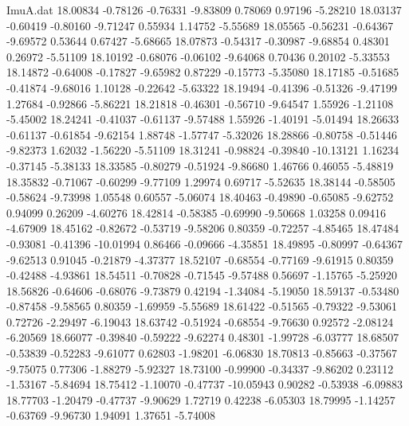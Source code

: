 \begin{filecontents}{ImuA.dat}
  18.00834   -0.78126   -0.76331   -9.83809    0.78069    0.97196   -5.28210
  18.03137   -0.60419   -0.80160   -9.71247    0.55934    1.14752   -5.55689
  18.05565   -0.56231   -0.64367   -9.69572    0.53644    0.67427   -5.68665
  18.07873   -0.54317   -0.30987   -9.68854    0.48301    0.26972   -5.51109
  18.10192   -0.68076   -0.06102   -9.64068    0.70436    0.20102   -5.33553
  18.14872   -0.64008   -0.17827   -9.65982    0.87229   -0.15773   -5.35080
  18.17185   -0.51685   -0.41874   -9.68016    1.10128   -0.22642   -5.63322
  18.19494   -0.41396   -0.51326   -9.47199    1.27684   -0.92866   -5.86221
  18.21818   -0.46301   -0.56710   -9.64547    1.55926   -1.21108   -5.45002
  18.24241   -0.41037   -0.61137   -9.57488    1.55926   -1.40191   -5.01494
  18.26633   -0.61137   -0.61854   -9.62154    1.88748   -1.57747   -5.32026
  18.28866   -0.80758   -0.51446   -9.82373    1.62032   -1.56220   -5.51109
  18.31241   -0.98824   -0.39840  -10.13121    1.16234   -0.37145   -5.38133
  18.33585   -0.80279   -0.51924   -9.86680    1.46766    0.46055   -5.48819
  18.35832   -0.71067   -0.60299   -9.77109    1.29974    0.69717   -5.52635
  18.38144   -0.58505   -0.58624   -9.73998    1.05548    0.60557   -5.06074
  18.40463   -0.49890   -0.65085   -9.62752    0.94099    0.26209   -4.60276
  18.42814   -0.58385   -0.69990   -9.50668    1.03258    0.09416   -4.67909
  18.45162   -0.82672   -0.53719   -9.58206    0.80359   -0.72257   -4.85465
  18.47484   -0.93081   -0.41396  -10.01994    0.86466   -0.09666   -4.35851
  18.49895   -0.80997   -0.64367   -9.62513    0.91045   -0.21879   -4.37377
  18.52107   -0.68554   -0.77169   -9.61915    0.80359   -0.42488   -4.93861
  18.54511   -0.70828   -0.71545   -9.57488    0.56697   -1.15765   -5.25920
  18.56826   -0.64606   -0.68076   -9.73879    0.42194   -1.34084   -5.19050
  18.59137   -0.53480   -0.87458   -9.58565    0.80359   -1.69959   -5.55689
  18.61422   -0.51565   -0.79322   -9.53061    0.72726   -2.29497   -6.19043
  18.63742   -0.51924   -0.68554   -9.76630    0.92572   -2.08124   -6.20569
  18.66077   -0.39840   -0.59222   -9.62274    0.48301   -1.99728   -6.03777
  18.68507   -0.53839   -0.52283   -9.61077    0.62803   -1.98201   -6.06830
  18.70813   -0.85663   -0.37567   -9.75075    0.77306   -1.88279   -5.92327
  18.73100   -0.99900   -0.34337   -9.86202    0.23112   -1.53167   -5.84694
  18.75412   -1.10070   -0.47737  -10.05943    0.90282   -0.53938   -6.09883
  18.77703   -1.20479   -0.47737   -9.90629    1.72719    0.42238   -6.05303
  18.79995   -1.14257   -0.63769   -9.96730    1.94091    1.37651   -5.74008

\end{filecontents}
